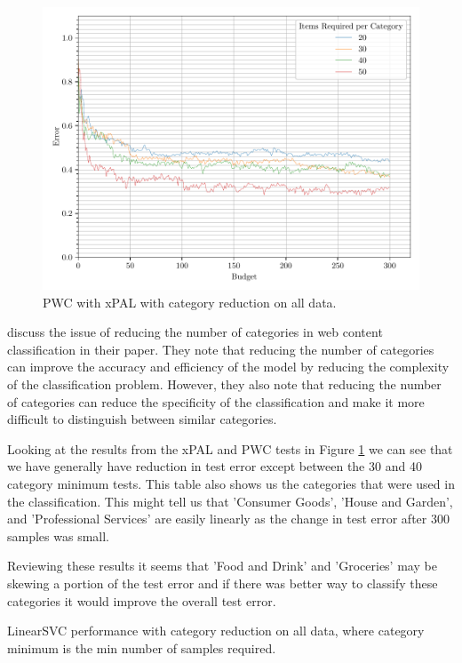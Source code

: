\begin{figure}[ht]
    \centering
    \includegraphics[width=\scale\textwidth]{../img/plot_text_data_all_category_reduction_test_results.pdf}
    \caption{PWC with xPAL with category reduction on all data.}
    \label{fig:all_data_category_reduction_xpal}
\end{figure}

\cite{dumais2000hierarchical} discuss the issue of reducing the number of categories in web content classification in their paper. They note that reducing the number of categories can improve the accuracy and efficiency of the model by reducing the complexity of the classification problem. However, they also note that reducing the number of categories can reduce the specificity of the classification and make it more difficult to distinguish between similar categories.

Looking at the results from the xPAL and PWC tests in Figure \ref{fig:all_data_category_reduction_xpal} we can see that we have generally have reduction in test error except between the 30 and 40 category minimum tests. This table also shows us the categories that were used in the classification. This might tell us that 'Consumer Goods', 'House and Garden', and 'Professional Services' are easily linearly as the change in test error after 300 samples was small.

Reviewing these results it seems that 'Food and Drink' and 'Groceries' may be skewing a portion of the test error and if there was better way to classify these categories it would improve the overall test error.

\begin{table}[ht]
     \centering  
     \caption{LinearSVC performance with category reduction on all data, where category minimum is the min number of samples required.}
     
     \label{tab:lscv_all_data_category_reduction} 
\end{table}

